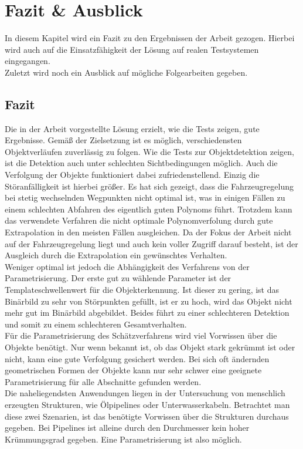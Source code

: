 \cleardoublepage
\section{Fazit \& Ausblick}
In diesem Kapitel wird ein Fazit zu den Ergebnissen der Arbeit gezogen. Hierbei wird auch auf die Einsatzfähigkeit der Lösung auf realen Testsystemen eingegangen.\\
Zuletzt wird noch ein Ausblick auf mögliche Folgearbeiten gegeben.
\subsection{Fazit}
Die in der Arbeit vorgestellte Lösung erzielt, wie die Tests zeigen, gute Ergebnisse. Gemäß der Zielsetzung ist es möglich, verschiedensten Objektverläufen zuverlässig zu folgen. Wie die Tests zur Objektdetektion zeigen, ist die Detektion auch unter schlechten Sichtbedingungen möglich. Auch die Verfolgung der Objekte funktioniert dabei zufriedenstellend. Einzig die Störanfälligkeit ist hierbei größer. Es hat sich gezeigt, dass die Fahrzeugregelung bei stetig wechselnden Wegpunkten nicht optimal ist, was in einigen Fällen zu einem schlechten Abfahren des eigentlich guten Polynoms führt. Trotzdem kann das verwendete Verfahren die nicht optimale Polynomverfolung durch gute Extrapolation in den meisten Fällen ausgleichen. Da der Fokus der Arbeit nicht auf der Fahrzeugregelung liegt und auch kein voller Zugriff darauf besteht, ist der Ausgleich durch die Extrapolation ein gewünschtes Verhalten.\\
Weniger optimal ist jedoch die Abhängigkeit des Verfahrens von der Parametrisierung. Der erste gut zu wählende Parameter ist der Templateschwellenwert für die Objekterkennung. Ist dieser zu gering, ist das Binärbild zu sehr von Störpunkten gefüllt, ist er zu hoch, wird das Objekt nicht mehr gut im Binärbild abgebildet. Beides führt zu einer schlechteren Detektion und somit zu einem schlechteren Gesamtverhalten.\\
Für die Parametrisierung des Schätzverfahrens wird viel Vorwissen über die Objekte benötigt. Nur wenn bekannt ist, ob das Objekt stark gekrümmt ist oder nicht, kann eine gute Verfolgung gesichert werden. Bei sich oft ändernden geometrischen Formen der Objekte kann nur sehr schwer eine geeignete Parametrisierung für alle Abschnitte gefunden werden.\\
Die naheliegendsten Anwendungen liegen in der Untersuchung von menschlich erzeugten Strukturen, wie Ölpipelines oder Unterwasserkabeln. Betrachtet man diese zwei Szenarien, ist das benötigte Vorwissen über die Strukturen durchaus gegeben. Bei Pipelines ist alleine durch den Durchmesser kein hoher Krümmungsgrad gegeben. Eine Parametrisierung ist also möglich.\\

